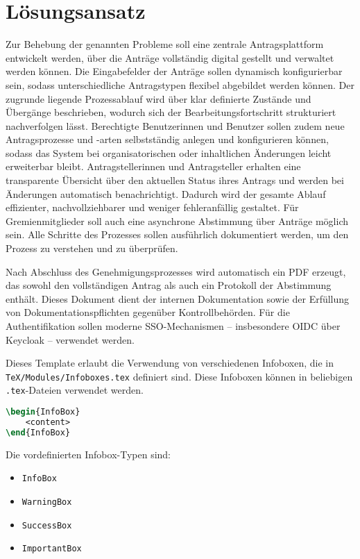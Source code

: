\chapter{Lösungsansatz}
Zur Behebung der genannten Probleme soll eine zentrale Antragsplattform entwickelt werden, über die Anträge vollständig digital gestellt und verwaltet werden können. Die Eingabefelder der Anträge sollen dynamisch konfigurierbar sein, sodass unterschiedliche Antragstypen flexibel abgebildet werden können. Der zugrunde liegende Prozessablauf wird über klar definierte Zustände und Übergänge beschrieben, wodurch sich der Bearbeitungsfortschritt strukturiert nachverfolgen lässt.
Berechtigte Benutzerinnen und Benutzer sollen zudem neue Antragsprozesse und -arten selbstständig anlegen und konfigurieren können, sodass das System bei organisatorischen oder inhaltlichen Änderungen leicht erweiterbar bleibt.
Antragstellerinnen und Antragsteller erhalten eine transparente Übersicht über den aktuellen Status ihres Antrags und werden bei Änderungen automatisch benachrichtigt. Dadurch wird der gesamte Ablauf effizienter, nachvollziehbarer und weniger fehleranfällig gestaltet.
Für Gremienmitglieder soll auch eine asynchrone Abstimmung über Anträge möglich sein.
Alle Schritte des Prozesses sollen ausführlich dokumentiert werden, um den Prozess zu verstehen und zu überprüfen.

Nach Abschluss des Genehmigungsprozesses wird automatisch ein PDF erzeugt, das sowohl den vollständigen Antrag als auch ein Protokoll der Abstimmung enthält. Dieses Dokument dient der internen Dokumentation sowie der Erfüllung von Dokumentationspflichten gegenüber Kontrollbehörden.
Für die Authentifikation sollen moderne SSO-Mechanismen – insbesondere OIDC über Keycloak – verwendet werden.

\iffalse
	Dieses Template erlaubt die Verwendung von verschiedenen Infoboxen, die in \texttt{TeX/Modules/Infoboxes.tex} definiert sind. Diese Infoboxen können in beliebigen \texttt{.tex}-Dateien verwendet werden.
	\smallskip
	\begin{lstlisting}[language=tex]
\begin{InfoBox}
    <content>
\end{InfoBox}
\end{lstlisting}
	\smallskip

	Die vordefinierten Infobox-Typen sind:

	\begin{itemize}
		\item \texttt{InfoBox}
		\item \texttt{WarningBox}
		\item \texttt{SuccessBox}
		\item \texttt{ImportantBox}
	\end{itemize}

